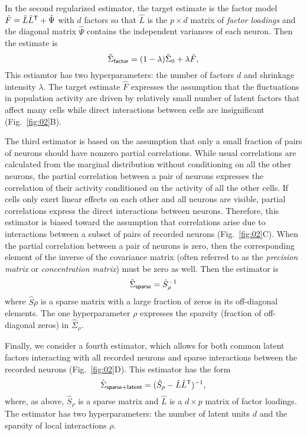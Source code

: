 In the second regularized estimator, the target estimate is the factor model $\hat F = \hat L \hat L^{\sf T} + \hat \Psi$ with $d$ factors so that $\hat L$ is the $p\times d$ matrix of \emph{factor loadings} and the diagonal matrix $\hat \Psi$ contains the independent variances of each neuron.
Then the estimate is 
\begin{equation}
\hat \Sigma_{\sf factor} = (1-\lambda) \hat \Sigma_0 + \lambda \hat F,
\end{equation}
This estiamtor has two hyperparameters: the number of factors $d$ and shrinkage intensity $\lambda$. The target estimate $\hat F$ expresses the assumption that the fluctuations in population activity are driven by relatively small number of latent factors that affect many cells while direct interactions between cells are insignificant (Fig.~\ref{fig:02}B).   

The third estimator is based on the assumption that only a small fraction of pairs of neurons should have nonzero partial correlations.  While usual correlations are calculated from the marginal distribution without conditioning on all the other neurons, the partial correlation between a pair of neurons expresses the correlation of their activity conditioned on the activity of all the other cells.  If cells only exert linear effects on each other and all neurons are visible, partial correlations express the direct interactions between neurons. Therefore, this estimator is biased toward the assumption that correlations arise due to interactions between a subset of pairs of recorded neurons (Fig.~\ref{fig:02}C). When the partial correlation between a pair of neurons is zero, then the corresponding element of the inverse of the covariance matrix (often referred to as the \emph{precision matrix} or \emph{concentration matrix}) must be zero as well. Then the estimator is 
\begin{equation}
\hat\Sigma_{\sf sparse} = \hat S_\rho^{-1}
\end{equation}
where $\hat S\rho$ is a sparse matrix with a large fraction of zeros in its off-diagonal elements. The  one hyperparameter $\rho$ expresses the sparsity (fraction of off-diagonal zeros) in $\hat\Sigma_\rho$.


Finally, we consider a fourth estimator, which allows for both common latent factors interacting with all recorded neurons and sparse interactions between the recorded neurons (Fig.~\ref{fig:02}D). This estimator has the form
\begin{equation}
\hat\Sigma_{\sf sparse+latent} = (\hat S_\rho - \hat L\hat L^{\sf T})^{-1},
\end{equation}
where, as above, $\hat S_\rho$ is a sparse matrix and $\hat L$ is a $d\times p$ matrix of factor loadings. The estimator has two hyperparameters: the number of latent units $d$ and the sparsity of local interactions $\rho$.


